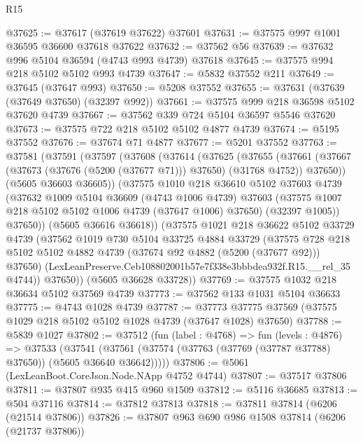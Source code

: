 \begin{lexlean}{R15}
\begin{coremodule}
{{{{{{{{{{{@37625 := @37617 (@37619 @37622) @37601
@37631 := @37575 @997 @1001 @36595 @36600 @37618 @37622
@37632 := @37562 @56
@37639 := @37632 @996 @5104 @36594 (@4743 @993 @4739) @37618
@37645 := @37575 @994 @218 @5102 @5102 @993 @4739
@37647 := @5832 @37552 @211
@37649 := @37645 (@37647 @993)
@37650 := @5208 @37552
@37655 := @37631 (@37639 (@37649 @37650) (@32397 @992))
@37661 := @37575 @999 @218 @36598 @5102 @37620 @4739
@37667 := @37562 @339 @724 @5104 @36597 @5546 @37620
@37673 := @37575 @722 @218 @5102 @5102 @4877 @4739
@37674 := @5195 @37552
@37676 := @37674 @71 @4877
@37677 := @5201 @37552
@37763 := @37581
    (@37591
      (@37597
        (@37608
          (@37614
            (@37625
              (@37655
                (@37661
                  (@37667 (@37673 (@37676 (@5200 (@37677 @71))) @37650) (@31768 @4752))
                  @37650))
              (@5605 @36603 @36605))
            (@37575
              @1010
              @218
              @36610
              @5102
              @37603
              @4739
              (@37632
                @1009
                @5104
                @36609
                (@4743 @1006 @4739)
                @37603
                (@37575 @1007 @218 @5102 @5102 @1006 @4739 (@37647 @1006) @37650)
                (@32397 @1005))
              @37650))
          (@5605 @36616 @36618))
        (@37575
          @1021
          @218
          @36622
          @5102
          @33729
          @4739
          (@37562
            @1019
            @730
            @5104
            @33725
            @4884
            @33729
            (@37575
              @728
              @218
              @5102
              @5102
              @4882
              @4739
              (@37674 @92 @4882 (@5200 (@37677 @92)))
              @37650)
            (LexLeanPreserve.Ceb108802001b57e7f338e3bbbdea932f.R15.__rel_35 @4744))
          @37650))
      (@5605 @36628 @33728))
@37769 := @37575 @1032 @218 @36634 @5102 @37569 @4739
@37773 := @37562 @133 @1031 @5104 @36633
@37775 := @4743 @1028 @4739
@37787 := @37773 @37775 @37569 (@37575 @1029 @218 @5102 @5102 @1028 @4739 (@37647 @1028) @37650)
@37788 := @5839 @1027
@37802 := @37512
    (fun (label : @4768) =>
    fun (levels : @4876) =>
    @37533
      (@37541 (@37561 (@37574 (@37763 (@37769 (@37787 @37788) @37650)) (@5605 @36640 @36642)))))
@37806 := @5061 (LexLeanBoot.CoreJson.Node.NApp @4752 @4744)
@37807 := @37517 @37806
@37811 := @37807 @935 @415 @960 @1509
@37812 := @5116 @36685
@37813 := @504 @37116
@37814 := @37812 @37813
@37818 := @37811 @37814 (@6206 (@21514 @37806))
@37826 := @37807 @963 @690 @986 @1508 @37814 (@6206 (@21737 @37806))
}}}}}}}}}}}
\end{coremodule}
\end{lexlean}
